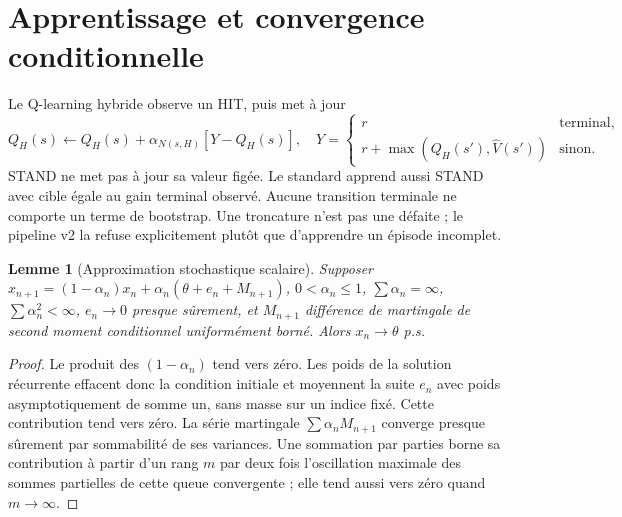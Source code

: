 \documentclass[11pt,a4paper]{article}
\newtheorem{lemme}{Lemme}
\theoremstyle{remark}\newtheorem*{remarque}{Remarque}
\newcommand{\1}{\mathbf 1}
\begin{document}
\section{Apprentissage et convergence conditionnelle}
Le Q-learning hybride observe un HIT, puis met à jour
\[
 Q_H(s)\leftarrow Q_H(s)+\alpha_{N(s,H)}[Y-Q_H(s)],\quad
 Y=\begin{cases}r&\text{terminal},\\r+\max(Q_H(s'),\widehat V(s'))&\text{sinon}.
 \end{cases}
\]
STAND ne met pas à jour sa valeur figée. Le standard apprend aussi STAND avec
cible égale au gain terminal observé. Aucune transition terminale ne comporte
un terme de bootstrap. Une troncature n'est pas une défaite ; le pipeline v2
la refuse explicitement plutôt que d'apprendre un épisode incomplet.

\begin{lemme}[Approximation stochastique scalaire]
Supposer $x_{n+1}=(1-\alpha_n)x_n+\alpha_n(\theta+e_n+M_{n+1})$,
$0<\alpha_n\le1$, $\sum\alpha_n=\infty$, $\sum\alpha_n^2<\infty$,
$e_n\to0$ presque sûrement, et $M_{n+1}$ différence de martingale de
second moment conditionnel uniformément borné. Alors $x_n\to\theta$ p.s.
\end{lemme}
\begin{proof}
Le produit des $(1-\alpha_n)$ tend vers zéro. Les poids de la solution
récurrente effacent donc la condition initiale et moyennent la suite $e_n$
avec poids asymptotiquement de somme un, sans masse sur un indice fixé.
Cette contribution tend vers zéro. La série martingale
$\sum\alpha_nM_{n+1}$ converge presque sûrement par sommabilité de ses
variances. Une sommation par parties borne sa contribution à partir d'un
rang $m$ par deux fois l'oscillation maximale des sommes partielles de cette
queue convergente ; elle tend aussi vers zéro quand $m\to\infty$.
\end{proof}
\end{document}
